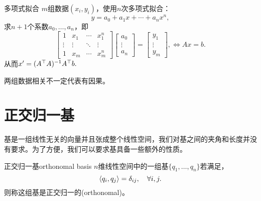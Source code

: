 \begin{example}{多项式拟合}{}
	$m$组数据$(x_i,y_i)$，使用$n$次多项式拟合：
	\[
		y=a_0+a_1x+\cdots+a_nx^n,
	\]
	求$n+1$个系数$a_0,\ldots,a_n$，即 
	\[
		\begin{bmatrix}
			1&x_1&\cdots&x_1^n\\\vdots&\vdots&\ddots&\vdots\\1&x_m&\cdots&x_m^n
		\end{bmatrix}
		\begin{bmatrix}
			a_0\\\vdots\\a_n
		\end{bmatrix}=
		\begin{bmatrix}
			y_1\\\vdots\\y_m
		\end{bmatrix},\iff Ax=b.
	\]
	从而$x'=(A^\top A)^{-1} A^\top b.$
\end{example}

\begin{remark}
	两组数据相关不一定代表有因果。
\end{remark}

\section{正交归一基}

基是一组线性无关的向量并且张成整个线性空间，我们对基之间的夹角和长度并没有要求。为了方便，我们可以要求基具备一些额外的性质。
\begin{definition}{正交归一基}{orthonomal basis}
	$n$维线性空间中的一组基$\{q_1,\ldots,q_n\}$若满足， 
	\[
		\left\langle q_i,q_j\right\rangle=\delta_{ij},\quad\forall i,j.
	\]
	则称这组基是正交归一的(orthonomal)。
\end{definition}

